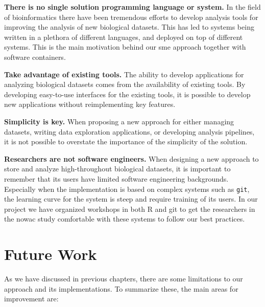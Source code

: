 \textbf{There is no single solution programming language or system.} 
In the field of bioinformatics there have been tremendous efforts to develop
analysis tools for improving the analysis of new biological datasets.  This has
led to systems being written in a plethora of different languages, and deployed
on top of different systems. This is the main motivation behind our \gls{sme}
approach together with software containers.

\textbf{Take advantage of existing tools.} The ability to develop applications
for analyzing biological datasets comes from the availability of existing tools.
By developing easy-to-use interfaces for the existing tools, it is possible
to develop new applications without reimplementing key features. 

\textbf{Simplicity is key.} When proposing a new approach for either managing
datasets, writing data exploration applications, or developing analysis
pipelines, it is not possible to overstate the importance of the simplicity of
the solution. 

\textbf{Researchers are not software engineers.} 
When designing a new approach to store and analyze high-throughout biological
datasets, it is important to remember that its users have limited software
engineering backgrounds. Especially when the implementation is based on complex
systems such as \texttt{git}, the learning curve for the system is steep and
require training of its users. In our project we have organized workshops in
both R and git to get the researchers in the \gls{nowac} study comfortable with
these systems to follow our best practices. 


\section{Future Work}
As we have discussed in previous chapters, there are some limitations to our
approach and its implementations. To summarize these, the main areas for
improvement are: 

